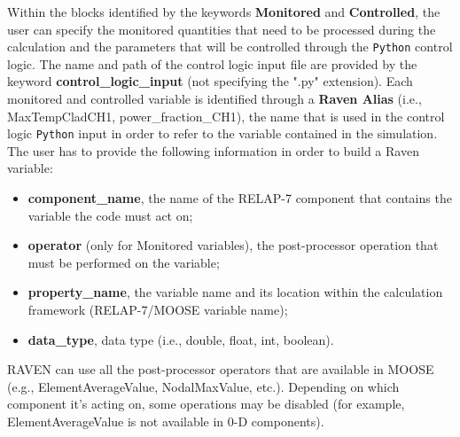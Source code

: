 \documentclass{mc2013}
\begin{document}
Within the blocks identified by the keywords \textbf{Monitored} and \textbf{Controlled}, the user can specify the monitored quantities that need to be processed during the calculation and the parameters that will be controlled through the \verb!Python! control logic. The name and path of the control logic input file are provided by the keyword  \textbf{control\_logic\_input} (not specifying the ".py" extension). Each monitored and controlled variable is identified through a \textbf{Raven Alias} (i.e., MaxTempCladCH1, power\_fraction\_CH1), the name that is used in the control logic \verb!Python! input in order to refer to the variable contained in the simulation.
The user has to provide the following information in order to build a Raven variable:
\begin{itemize}
  \item \textbf{component\_name}, the name of the RELAP-7 component that contains the variable the code must act on;
  \item \textbf{operator} (only for Monitored variables), the post-processor operation that must be performed on the variable;
  \item \textbf{property\_name}, the variable name and its location within the calculation framework (RELAP-7/MOOSE variable name);
  \item \textbf{data\_type}, data type (i.e., double, float, int, boolean).
\end{itemize}
RAVEN can use all the post-processor operators that are available in MOOSE (e.g., ElementAverageValue, NodalMaxValue, etc.). Depending on which component it's acting on, some operations may be disabled (for example,  ElementAverageValue is not available in 0-D components).
%
\end{document}
